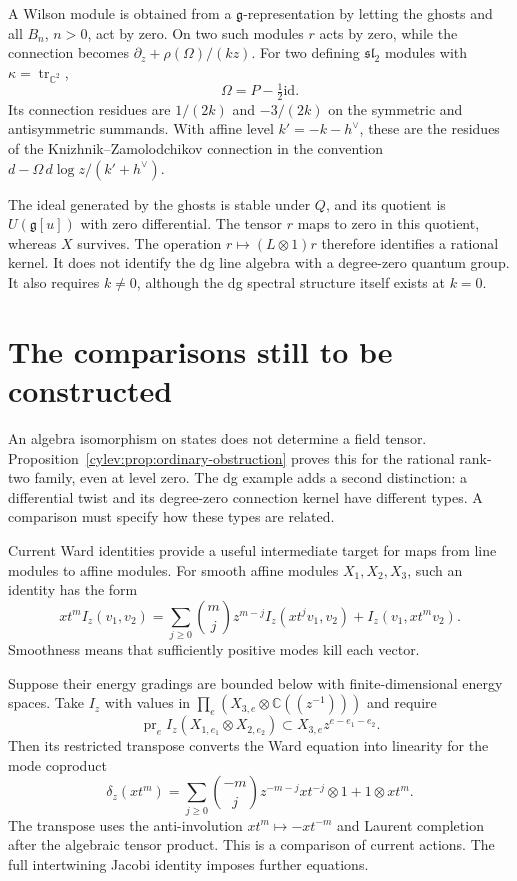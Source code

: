 A Wilson module is obtained from a $\mathfrak g$-representation
by letting the ghosts and all $B_n$, $n>0$, act by zero.
On two such modules $r$ acts by zero, while the connection becomes
$\partial_z+\rho(\Omega)/(kz)$.
For two defining $\mathfrak{sl}_2$ modules with
$\kappa=\operatorname{tr}_{\mathbb C^2}$,
\[
 \Omega=P-\tfrac12\mathrm{id}.
\]
Its connection residues are $1/(2k)$ and $-3/(2k)$ on the symmetric
and antisymmetric summands.
With affine level $k'=-k-h^\vee$, these are the residues of the
Knizhnik--Zamolodchikov connection in the convention
$d-\Omega\,d\log z/(k'+h^\vee)$.

The ideal generated by the ghosts is stable under $Q$, and its
quotient is $U(\mathfrak g[u])$ with zero differential.
The tensor $r$ maps to zero in this quotient, whereas $X$ survives.
The operation $r\mapsto(L\otimes1)r$ therefore identifies a rational
kernel. It does not identify the dg line algebra with a degree-zero
quantum group.
It also requires $k\ne0$, although the dg spectral structure itself
exists at $k=0$.

\section{The comparisons still to be constructed}
\label{cylev:sec:comparisons}

An algebra isomorphism on states does not determine a field tensor.
Proposition~\ref{cylev:prop:ordinary-obstruction} proves this for the
rational rank-two family, even at level zero.
The dg example adds a second distinction: a differential twist and
its degree-zero connection kernel have different types.
A comparison must specify how these types are related.

Current Ward identities provide a useful intermediate target for
maps from line modules to affine modules.
For smooth affine modules $X_1,X_2,X_3$, such an identity has the form
\[
 xt^m I_z(v_1,v_2)
 =\sum_{j\ge0}\binom mj z^{m-j}I_z(xt^jv_1,v_2)
                         +I_z(v_1,xt^mv_2).
\]
Smoothness means that sufficiently positive modes kill each vector.

Suppose their energy gradings are bounded below with
finite-dimensional energy spaces.
Take $I_z$ with values in
$\prod_e(X_{3,e}\otimes\mathbb C((z^{-1})))$ and require
\[
 \operatorname{pr}_e I_z(X_{1,e_1}\otimes X_{2,e_2})
                   \subset X_{3,e}z^{e-e_1-e_2}.
\]
Then its restricted transpose converts the Ward equation into
linearity for the mode coproduct
\[
 \delta_z(xt^m)=\sum_{j\ge0}\binom{-m}{j}z^{-m-j}
                         xt^{-j}\otimes1+1\otimes xt^m.
\]
The transpose uses the anti-involution $xt^m\mapsto-xt^{-m}$ and
Laurent completion after the algebraic tensor product.
This is a comparison of current actions.
The full intertwining Jacobi identity imposes further equations.

